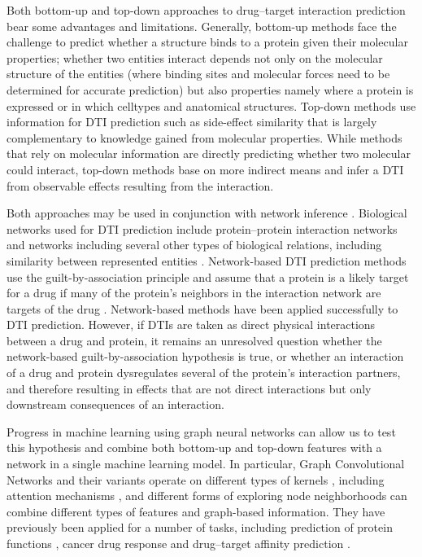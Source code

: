 \documentclass{bioinfo}
\renewcommand{\cite}{\citep}
\begin{document}
Both bottom-up and top-down approaches to drug--target interaction
prediction bear some advantages and limitations. Generally, bottom-up
methods face the challenge to predict whether a structure binds to a
protein given their molecular properties; whether two entities
interact depends not only on the molecular structure of the entities
(where binding sites and molecular forces need to be determined for
accurate prediction) but also properties namely where a protein is
expressed or in which celltypes and anatomical structures. Top-down
methods use information for DTI prediction such as side-effect
similarity \cite{Campillos2008} that is largely complementary to
knowledge gained from molecular properties. While methods that rely on
molecular information are directly predicting whether two molecular
could interact, top-down methods base on more indirect means and 
infer a DTI from observable effects resulting from the interaction.

Both approaches may be used in conjunction with network inference
\cite{Chen2015}. Biological networks used for DTI prediction include
protein--protein interaction networks \cite{Feng2017, Lee2018} and
networks including several other types of biological relations,
including similarity between represented entities \cite{Ding2013,
  Gottlieb2011}. Network-based DTI prediction methods use the
guilt-by-association principle \cite{Oliver2000} and assume that a
protein is a likely target for a drug if many of the protein's
neighbors in the interaction network are targets of the drug
\cite{Gillis2012}. Network-based methods have been applied
successfully to DTI prediction. However, if DTIs are taken as direct
physical interactions between a drug and protein, it remains an
unresolved question whether the network-based guilt-by-association
hypothesis is true, or whether an interaction of a drug and protein
dysregulates several of the protein's interaction partners, and
therefore resulting in effects that are not direct interactions but
only downstream consequences of an interaction.

Progress in machine learning using graph neural networks can allow us
to test this hypothesis and combine both bottom-up and top-down
features with a network in a single machine learning model. 
In particular, Graph Convolutional Networks \cite{GCNConv} and
their variants operate on different types of kernels \cite{ChebConv,
  ARMAConv}, including attention mechanisms \cite{GATConv}, and
different forms of exploring node neighborhoods \cite{APPNPConv,
  SAGEConv} can combine different types of features and graph-based
information. %
They have previously been applied for a number of tasks, including
prediction of protein functions \cite{Zitnik2017}, cancer drug
response \cite{Liu2020} and drug--target affinity prediction
\cite{GraphDTA2020}.
\end{document}
